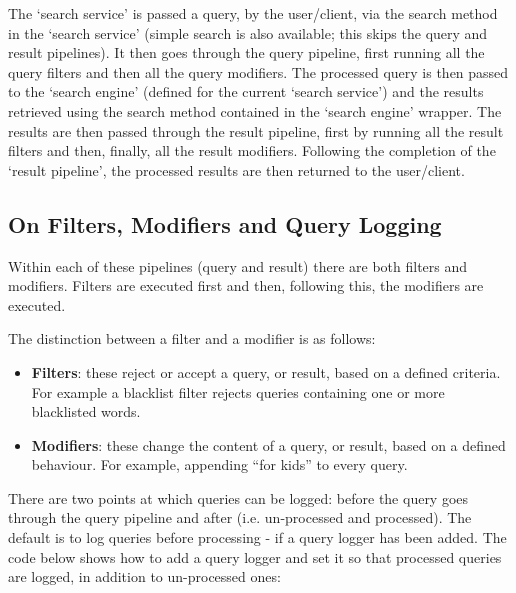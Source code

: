 \documentclass[letterpaper,10pt,english]{sphinxmanual}
\begin{document}
The `search service' is passed a query, by the user/client, via the search method in the `search service' (simple search is also available; this skips the query and result pipelines). It then goes through the query pipeline, first running all the query filters and then all the query modifiers. The processed query is then passed to the `search engine' (defined for the current `search service') and the results retrieved using the search method contained in the `search engine' wrapper. The results are then passed through the result pipeline, first by running all the result filters and then, finally, all the result modifiers. Following the completion of the `result pipeline', the processed results are then returned to the user/client.


\subsection{On Filters, Modifiers and Query Logging}
\label{service:on-filters-modifiers-and-query-logging}
Within each of these pipelines (query and result) there are both filters and modifiers. Filters are executed first and then, following this, the modifiers are executed.

The distinction between a filter and a modifier is as follows:
\begin{itemize}
\item {} 
\textbf{Filters}: these reject or accept a query, or result, based on a defined criteria. For example a blacklist filter rejects queries containing one or more blacklisted words.

\item {} 
\textbf{Modifiers}: these change the content of a query, or result, based on a defined behaviour. For example, appending “for kids” to every query.

\end{itemize}

There are two points at which queries can be logged: before the query goes through the query pipeline and after (i.e. un-processed and processed). The default is to log queries before processing - if a query logger has been added. The code below shows how to add a query logger and set it so that processed queries are logged, in addition to un-processed ones:
\end{document}
